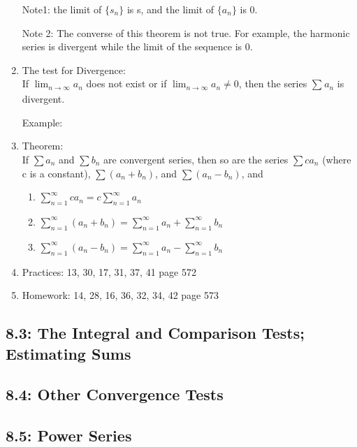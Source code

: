 \documentclass[12pt]{amsart}
\begin{document}
\begin{enumerate}
Note1: the limit of $\{ s_n\}$ is s, and the limit of $\{ a_n\}$ is 0. 

Note 2: The converse of this theorem is not true. For example, the harmonic series is divergent while the limit of the sequence is 0.\\


\item The test for Divergence: \\
	If $\lim_{n \to \infty}a_n $ does not exist or if $\lim_{n \to \infty}a_n \neq 0$, then the series $\sum_{}^{} a_n $ is divergent. 
	
	Example: \\
	
\item Theorem: \\
	If $\sum a_n$ and $\sum b_n$ are convergent series, then so are the series $\sum ca_n$ (where c is a constant), $\sum (a_n + b_n)$, and $\sum (a_n - b_n)$, and 
		\begin{enumerate}
		
			\item $\sum_{n=1}^{\infty} ca_n = c \sum_{n=1}^{\infty}a_n$
			
			\item $ \sum_{n=1}^{\infty}(a_n+b_n) = \sum_{n=1}^{\infty}a_n + \sum_{n=1}^{\infty}b_n $
			
			\item $\sum_{n=1}^{\infty}(a_n - b_n) = \sum_{n=1}^{\infty}a_n - \sum_{n=1}^{\infty}b_n$
		\end{enumerate}	
		
\item Practices: 13, 30, 17, 31, 37, 41 page 572 \\ 

\item Homework: 14, 28, 16, 36, 32, 34, 42 page 573		
\end{enumerate}

\newpage
\subsection{8.3: The Integral and Comparison Tests; Estimating Sums}

\newpage
\subsection{8.4: Other Convergence Tests}

\newpage
\subsection{8.5: Power Series}
\end{document}
